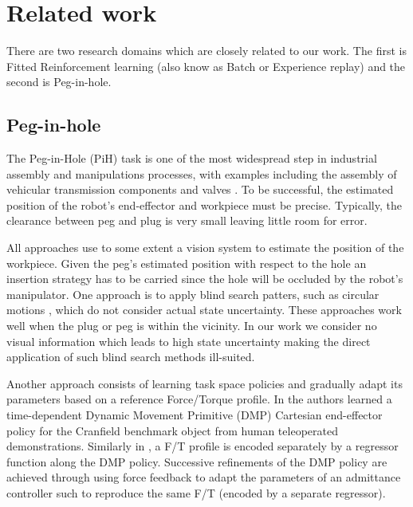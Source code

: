 \documentclass[final,3p,times,twocolumn]{elsarticle}
\begin{document}
\section{Related work}\label{sec:related_work}

There are two research domains which are closely related to our work. The first 
is Fitted Reinforcement learning (also know as Batch or Experience replay) and the 
second is Peg-in-hole.

\subsection{Peg-in-hole}

The Peg-in-Hole (PiH) task is one of the most widespread step in industrial assembly and manipulations processes, 
with examples including the assembly of vehicular transmission components \cite{search_strategies_icra_2001} and 
valves \cite{online_gpr_icra_2014}. To be successful, the estimated position of the robot's end-effector 
and workpiece must be precise. Typically, the clearance between peg and plug is very small leaving little 
room for error.

All approaches use to some extent a vision system \cite{peg_personal_icra_2010} to estimate 
the position of the workpiece. Given  the peg's estimated position with respect to the hole 
an insertion strategy has to be carried since the hole will be occluded by 
the robot's manipulator. One approach is to apply blind search patters, such as circular 
motions \cite{search_strategies_icra_2001}, which do not consider actual state uncertainty. 
These approaches work well when the plug or peg is within the vicinity. In our work we consider 
no visual information which leads to high state uncertainty making the direct application 
of such blind search methods ill-suited.

Another approach consists of learning task space policies and gradually adapt its parameters based on a reference
Force/Torque profile. In \cite{fast_peg_pbd_icmc_2014} the authors learned a time-dependent Dynamic Movement 
Primitive (DMP) \cite{Schaal04learningmovement} Cartesian end-effector policy for the Cranfield benchmark 
object from human teleoperated demonstrations. Similarly in \cite{trans_workpiece_icra_2013,sol_pdg_pbd_2014}, 
a F/T profile is encoded separately by a regressor function along the DMP policy. Successive refinements of 
the DMP policy are achieved through using force feedback to adapt the parameters of an admittance controller such 
to reproduce the same F/T (encoded by a separate regressor).
\end{document}
